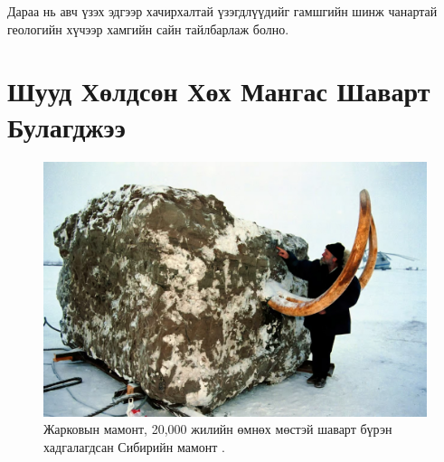 \documentclass[10pt,twocolumn,letterpaper]{article}
\begin{document}
Дараа нь авч үзэх эдгээр хачирхалтай үзэгдлүүдийг гамшгийн шинж чанартай геологийн хүчээр хамгийн сайн тайлбарлаж болно.

\section{Шууд Хөлдсөн Хөх Мангас Шаварт Булагджээ}

\begin{figure}[t]
\begin{center}
   \includegraphics[width=1\linewidth]{jarkov-mammoth.jpg}
\end{center}
   \caption{Жарковын мамонт, 20,000 жилийн өмнөх мөстэй шаварт бүрэн хадгалагдсан Сибирийн мамонт \cite{51}.}
\label{fig:1}
\label{fig:onecol}
\end{figure}
\end{document}
